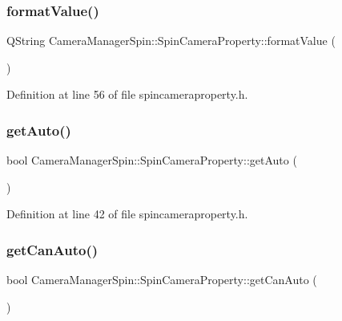 \subsubsection{\texorpdfstring{formatValue()}{formatValue()}}
{\footnotesize\ttfamily Q\+String Camera\+Manager\+Spin\+::\+Spin\+Camera\+Property\+::format\+Value (\begin{DoxyParamCaption}{ }\end{DoxyParamCaption})\hspace{0.3cm}{\ttfamily [inline]}}



Definition at line 56 of file spincameraproperty.\+h.

\mbox{\label{class_camera_manager_spin_1_1_spin_camera_property_a985c2037105c514595ec67b5356b2a88}} 
\subsubsection{\texorpdfstring{getAuto()}{getAuto()}}
{\footnotesize\ttfamily bool Camera\+Manager\+Spin\+::\+Spin\+Camera\+Property\+::get\+Auto (\begin{DoxyParamCaption}{ }\end{DoxyParamCaption})\hspace{0.3cm}{\ttfamily [inline]}}



Definition at line 42 of file spincameraproperty.\+h.

\mbox{\label{class_camera_manager_spin_1_1_spin_camera_property_ac9caec91860d8348124f7280eaee5190}} 
\subsubsection{\texorpdfstring{getCanAuto()}{getCanAuto()}}
{\footnotesize\ttfamily bool Camera\+Manager\+Spin\+::\+Spin\+Camera\+Property\+::get\+Can\+Auto (\begin{DoxyParamCaption}{ }\end{DoxyParamCaption})\hspace{0.3cm}{\ttfamily [inline]}}



